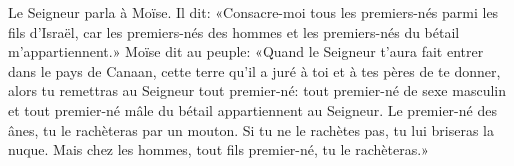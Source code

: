 Le Seigneur parla à Moïse.
Il dit: «Consacre-moi tous les premiers-nés parmi les fils d’Israël,
	car les premiers-nés des hommes et les premiers-nés du bétail m’appartiennent.»
Moïse dit au peuple:
	«Quand le Seigneur t’aura fait entrer dans le pays de Canaan,
	cette terre qu’il a juré à toi et à tes pères de te donner,
	alors tu remettras au Seigneur tout premier-né:
	tout premier-né de sexe masculin
		et tout premier-né mâle du bétail appartiennent au Seigneur.
Le premier-né des ânes, tu le rachèteras par un mouton.
	Si tu ne le rachètes pas, tu lui briseras la nuque.
Mais chez les hommes, tout fils premier-né, tu le rachèteras.»
